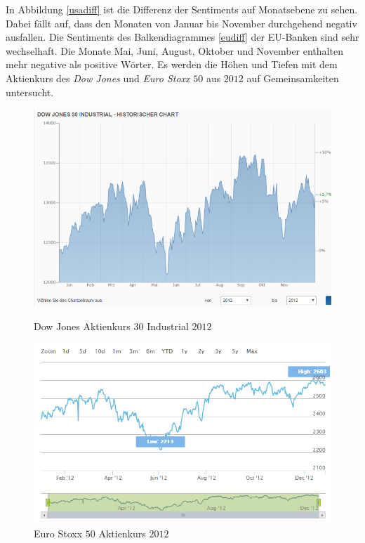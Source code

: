 In Abbildung \ref{usadiff} ist die Differenz der Sentiments auf Monatsebene zu sehen. Dabei fällt auf, dass den Monaten von Januar bis November durchgehend negativ ausfallen. Die Sentiments des Balkendiagrammes \ref{eudiff} der EU-Banken sind sehr wechselhaft. Die Monate Mai, Juni, August, Oktober und November enthalten mehr negative als positive Wörter. Es werden die Höhen und Tiefen mit dem Aktienkurs des \textit{Dow Jones} und \textit{Euro Stoxx} $50$ aus $2012$ auf Gemeinsamkeiten untersucht.
 \begin{figure}[H]
 \begin{minipage}[b]{.4\linewidth} %
 	\includegraphics[width=1\textwidth]{Pictures/DowJones2012.png}
 	\caption{Dow Jones Aktienkurs 30 Industrial $2012$ \cite{Dow}}\label{dowjones}
 \end{minipage}
 \hspace{.2\linewidth}%
 \begin{minipage}[b]{.4\linewidth} %
 	\includegraphics[width=1\textwidth]{Pictures/EuroxStoxx.png}
 	\caption{Euro Stoxx $50$ Aktienkurs $2012$ \cite{eurostoxx}} \label{eustoxx}
 \end{minipage}

\end{figure}
